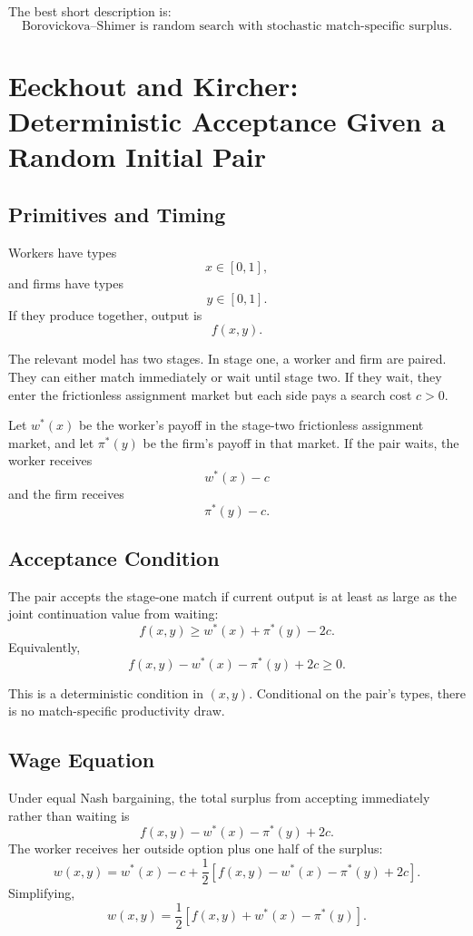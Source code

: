 \documentclass[11pt]{article}
\newcommand{\1}{\mathbf{1}}
\begin{document}
The best short description is:
\[
\boxed{\text{Borovickova--Shimer is random search with stochastic match-specific surplus.}}
\]

\section{Eeckhout and Kircher: Deterministic Acceptance Given a Random Initial Pair}

\subsection{Primitives and Timing}

Workers have types
\[
x\in[0,1],
\]
and firms have types
\[
y\in[0,1].
\]
If they produce together, output is
\[
f(x,y).
\]

The relevant model has two stages. In stage one, a worker and firm are paired. They can either match immediately or wait until stage two. If they wait, they enter the frictionless assignment market but each side pays a search cost $c>0$.

Let $w^*(x)$ be the worker's payoff in the stage-two frictionless assignment market, and let $\pi^*(y)$ be the firm's payoff in that market. If the pair waits, the worker receives
\[
w^*(x)-c
\]
and the firm receives
\[
\pi^*(y)-c.
\]

\subsection{Acceptance Condition}

The pair accepts the stage-one match if current output is at least as large as the joint continuation value from waiting:
\[
f(x,y)\geq w^*(x)+\pi^*(y)-2c.
\]
Equivalently,
\[
\boxed{
f(x,y)-w^*(x)-\pi^*(y)+2c\geq 0.
}
\]

This is a deterministic condition in $(x,y)$. Conditional on the pair's types, there is no match-specific productivity draw.

\subsection{Wage Equation}

Under equal Nash bargaining, the total surplus from accepting immediately rather than waiting is
\[
f(x,y)-w^*(x)-\pi^*(y)+2c.
\]
The worker receives her outside option plus one half of the surplus:
\[
w(x,y)
=
w^*(x)-c
+\frac{1}{2}\left[f(x,y)-w^*(x)-\pi^*(y)+2c\right].
\]
Simplifying,
\[
w(x,y)
=
\frac{1}{2}\left[f(x,y)+w^*(x)-\pi^*(y)\right].
\]
\end{document}
